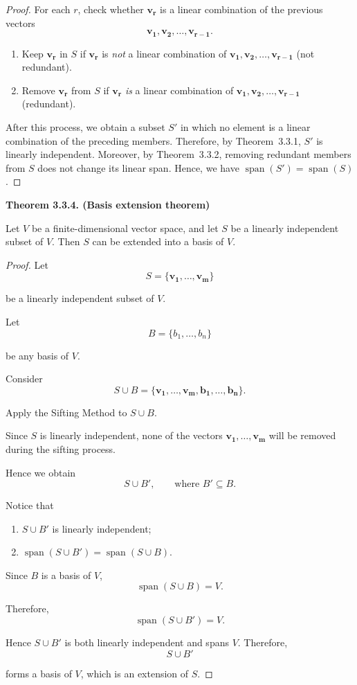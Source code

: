 \documentclass[12pt]{article}
\begin{document}
\begin{proof}
For each $r$, check whether $\mathbf{v_r}$ is a linear combination of the
previous vectors
\[
\mathbf{v_1,v_2,\ldots,v_{r-1}}.
\]

\begin{enumerate}
    \item Keep $\mathbf{v_r}$ in $S$ if $\mathbf{v_r}$ is \emph{not} a linear combination of
    $\mathbf{v_1,v_2,\ldots,v_{r-1}}$ (not redundant).

    \item Remove $\mathbf{v_r}$ from $S$ if $\mathbf{v_r}$ \emph{is} a linear combination of
    $\mathbf{v_1,v_2,\ldots,v_{r-1}}$ (redundant).
\end{enumerate}

After this process, we obtain a subset $S'$ in which no element is a
linear combination of the preceding members. Therefore, by Theorem~3.3.1, $S'$ is linearly independent.
Moreover, by Theorem~3.3.2, removing redundant members from $S$ does not
change its linear span. Hence, we have $\operatorname{span}(S')=\operatorname{span}(S)$.

\end{proof}

\textbf{Theorem 3.3.4. (Basis extension theorem)}

Let $V$ be a finite-dimensional vector space, and let $S$ be a linearly independent subset of $V$. Then $S$ can be extended into a basis of $V$.

\begin{proof}
Let
\[
S=\{\mathbf{v_1,\ldots,v_m}\}
\]

be a linearly independent subset of $V$.

Let
\[
B=\{b_1,\ldots,b_n\}
\]

be any basis of $V$.

Consider
\[
S\cup B = \{\mathbf{v_1,\ldots,v_m,b_1,\ldots,b_n}\}.
\]

Apply the Sifting Method to $S\cup B$.

Since $S$ is linearly independent, none of the vectors
$\mathbf{v_1,\ldots,v_m}$ will be removed during the sifting process.

Hence we obtain
\[
S\cup B',\qquad\text{where }B'\subseteq B.
\]

Notice that

\begin{enumerate}
    \item $S\cup B'$ is linearly independent;
    \item $\operatorname{span}(S\cup B')= \operatorname{span}(S\cup B).$
\end{enumerate}

Since $B$ is a basis of $V$,
\[
\operatorname{span}(S\cup B)=V.
\]

Therefore,
\[
\operatorname{span}(S\cup B')=V.
\]

Hence $S\cup B'$ is both linearly independent and spans $V$.
Therefore,
\[
S\cup B'
\]

forms a basis of $V$, which is an extension of $S$.
\end{proof}
\end{document}
